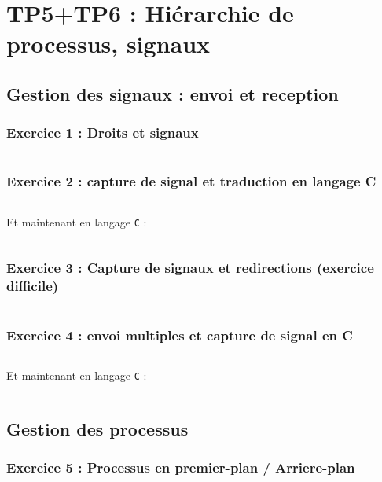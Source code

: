 \chapter{TP5+TP6 : Hiérarchie de processus, signaux}

\section{Gestion des signaux : envoi et reception}

\subsection{Exercice 1 : Droits et signaux}

\inputminted[linenos]{cpp}{../sources/cpp/TP5-6/ex1.c}

\subsection{Exercice 2 : capture de signal et traduction en langage C}

\inputminted{bash}{../sources/cpp/TP5-6/ex2-boucle.sh}
Et maintenant en langage \texttt{C} :
\inputminted[linenos,firstline=5, lastline=27]{cpp}{../sources/cpp/TP5-6/ex2.c}

\subsection{Exercice 3 : Capture de signaux et redirections (exercice difficile)}

\inputminted[linenos]{bash}{../sources/cpp/TP5-6/ex3-testKillerSignal.sh}

\subsection{Exercice 4 : envoi multiples et capture de signal en C}

\inputminted{bash}{../sources/cpp/TP5-6/ex4-captureShell.sh}
Et maintenant en langage \texttt{C} :
\inputminted[linenos,firstline=5, lastline=23]{cpp}{../sources/cpp/TP5-6/ex4.c}

\section{Gestion des processus}

\subsection{Exercice 5 : Processus en premier-plan / Arriere-plan}


